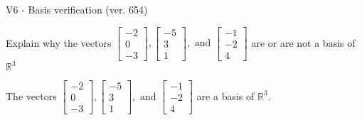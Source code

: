 \begin{exercise}
  \begin{exerciseTitle}V6 - Basis verification (ver. 654)\end{exerciseTitle}
  \begin{exerciseStatement}
    Explain why the vectors \(\left[\begin{array}{r}
-2 \\
0 \\
-3
\end{array}\right] , \left[\begin{array}{r}
-5 \\
3 \\
1
\end{array}\right] , \text{ and } \left[\begin{array}{r}
-1 \\
-2 \\
4
\end{array}\right]\) are or are not a basis of \(\mathbb{R}^3\)	


  \end{exerciseStatement}
  \begin{exerciseAnswer}
   The vectors \(\left[\begin{array}{r}
-2 \\
0 \\
-3
\end{array}\right] , \left[\begin{array}{r}
-5 \\
3 \\
1
\end{array}\right] , \text{ and } \left[\begin{array}{r}
-1 \\
-2 \\
4
\end{array}\right]\) 
  	 are  a basis of \(\mathbb{R}^3\).
  


  \end{exerciseAnswer}
\end{exercise}